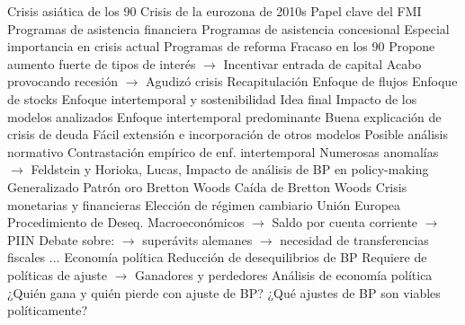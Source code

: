 \documentclass{nuevotema}
\begin{document}
\begin{esquemal}
				\4 Crisis asiática de los 90
				\4 Crisis de la eurozona de 2010s
			\3 Papel clave del FMI
				\4 Programas de asistencia financiera
				\4[]
				\4 Programas de asistencia concesional
				\4[] Especial importancia en crisis actual
				\4 Programas de reforma
				\4[]
				\4 Fracaso en los 90
				\4[] Propone aumento fuerte de tipos de interés
				\4[] $\to$ Incentivar entrada de capital
				\4[] Acabo provocando recesión
				\4[] $\to$ Agudizó crisis
	\1[] 
		\2 Recapitulación
			\3 Enfoque de flujos
			\3 Enfoque de stocks
			\3 Enfoque intertemporal y sostenibilidad
		\2 Idea final
			\3 Impacto de los modelos analizados
				\4 Enfoque intertemporal predominante
				\4[] Buena explicación de crisis de deuda
				\4[] Fácil extensión e incorporación de otros modelos
				\4[] Posible análisis normativo
				\4 Contrastación empírico de enf. intertemporal
				\4[] Numerosas anomalías
				\4[] $\to$ Feldstein y Horioka, Lucas,
			\3 Impacto de análisis de BP en policy-making
				\4 Generalizado
				\4 Patrón oro
				\4 Bretton Woods
				\4 Caída de Bretton Woods
				\4 Crisis monetarias y financieras
				\4 Elección de régimen cambiario
				\4 Unión Europea
				\4[] Procedimiento de Deseq. Macroeconómicos
				\4[] $\to$ Saldo por cuenta corriente
				\4[] $\to$ PIIN
				\4[] Debate sobre:
				\4[] $\to$ superávits alemanes
				\4[] $\to$ necesidad de transferencias fiscales
				\4[] ...
			\3 Economía política
				\4 Reducción de desequilibrios de BP
				\4[] Requiere de políticas de ajuste
				\4[] $\to$ Ganadores y perdedores
				\4 Análisis de economía política
				\4[] ¿Quién gana y quién pierde con ajuste de BP?
				\4[] ¿Qué ajustes de BP son viables políticamente?
\end{esquemal}























\graficas
\end{document}
